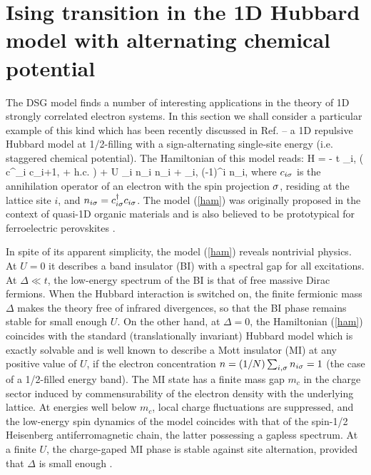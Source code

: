 \section{Ising transition in the 1D Hubbard model with
alternating chemical potential}


The DSG model finds a number of interesting applications in the theory of
1D strongly correlated electron systems. 
In this section we shall consider a particular example of this kind 
which has been recently discussed in Ref.\cite{FGN} -- a 1D repulsive Hubbard 
model
at 1/2-filling with a sign-alternating single-site energy (i.e. staggered 
chemical 
potential). The Hamiltonian of this model reads:
\be
H = - t \sum_{i,\s} \left( c^{\dagger}_{i\s} c_{i+1,\s} + h.c. \right)
+ U \sum_i n_{i\up} n_{i\down}
+ \Delta \sum_{i,\s} (-1)^i n_{i\s},
\label{ham}
\ee
where $c_{i\sigma}$ is the annihilation operator of an electron with the spin 
projection
$\sigma$, residing at the lattice site $i$,
and $n_{i\sigma} = c^{\dagger}_{i\sigma} c_{i\sigma}$.
The model (\ref{ham}) was originally proposed in the context of quasi-1D organic 
materials \cite{nagaosa} and is also believed to be prototypical
for ferroelectric perovskites \cite{egami}.

In spite of its apparent simplicity, the model (\ref{ham}) reveals nontrivial
physics. At $U = 0$ it describes a band insulator (BI) with a spectral gap for
all excitations. At $\Delta \ll t$,
the low-energy spectrum of the BI is that of free massive 
Dirac fermions. 
When the Hubbard interaction is switched on,
the finite fermionic mass $\Delta$ makes the theory
free of infrared divergences, so that the BI phase remains stable
for small enough $U$.
On the other hand, at $\Delta = 0$, the Hamiltonian (\ref{ham})
coincides with the standard (translationally invariant) Hubbard model which
is exactly solvable \cite{LW} and is well known to
describe a Mott insulator (MI) at any positive value of $U$,
if the electron concentration $n = (1/N)\sum_{i,\sigma} n_{i\sigma} = 1$
(the case of a 1/2-filled energy band). 
The MI state has a finite mass gap $m_c$ in the charge
sector induced by commensurability of the electron density with
the underlying lattice. At energies well below $m_c$, 
local charge fluctuations are suppressed, and the low-energy 
spin dynamics of the model
coincides with that of the spin-1/2 Heisenberg antiferromagnetic chain,
the latter possessing a gapless spectrum.
At a finite $U$, the charge-gaped MI phase is stable against site alternation,
provided that $\Delta$ is small enough \cite{nagaosa}. 

